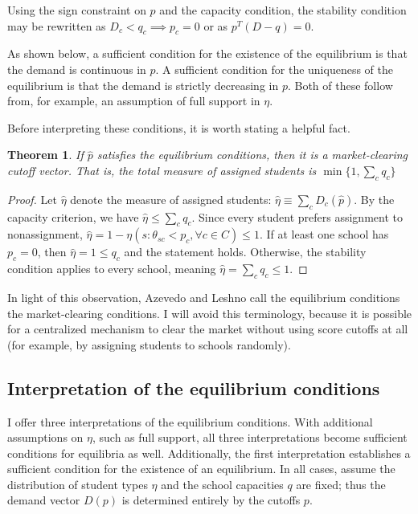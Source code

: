 \documentclass[12pt]{article}
\newtheorem{theorem}{Theorem}
\theoremstyle{definition}
\begin{document}
Using the sign constraint on $p$ and the capacity condition, the stability condition may be rewritten as $D_c < q_c \implies p_c = 0$ or as $p^T \left(D - q\right) = 0$.

As shown below, a sufficient condition for the existence of the equilibrium is that the demand is continuous in $p$. A sufficient condition for the uniqueness of the equilibrium is that the demand is strictly decreasing in $p$. Both of these follow from, for example, an assumption of full support in $\eta$. 

Before interpreting these conditions, it is worth stating a helpful fact. 

\begin{theorem}If $\hat p$ satisfies the equilibrium conditions, then it is a market-clearing cutoff vector. That is, the total measure of assigned students is $\min\{1, \sum_c q_c\}$
\end{theorem}

\begin{proof}Let $\hat \eta$ denote the measure of assigned students: $\hat \eta \equiv \sum_c D_c(\hat p)$. By the capacity criterion, we have $\hat \eta \leq \sum_c q_c$. Since every student prefers assignment to nonassignment, $\hat \eta = 1 - \eta ( s: \theta_{sc} < p_c, \forall c \in C) \leq 1$. If at least one school has $p_c = 0$, then $\hat \eta = 1 \leq q_c$ and the statement holds. Otherwise, the stability condition applies to every school, meaning $\hat \eta = \sum_c q_c \leq 1$. \end{proof}

In light of this observation, Azevedo and Leshno \parencite*{supplydemandfw} call the equilibrium conditions the market-clearing conditions. I will avoid this terminology, because it is possible for a centralized mechanism to clear the market without using score cutoffs at all (for example, by assigning students to schools randomly). 

\subsection{Interpretation of the equilibrium conditions}
I offer three interpretations of the equilibrium conditions. With additional assumptions on $\eta$, such as full support, all three interpretations become sufficient conditions for equilibria as well. Additionally, the first interpretation establishes a sufficient condition for the existence of an equilibrium. In all cases, assume the distribution of student types $\eta$ and the school capacities $q$ are fixed; thus the demand vector $D(p)$ is determined entirely by the cutoffs $p$. 
\end{document}
